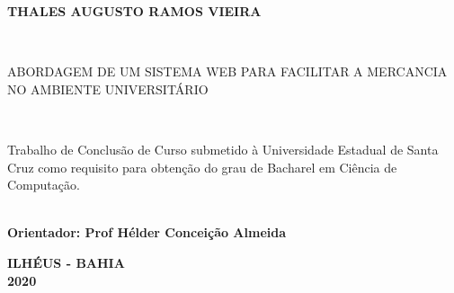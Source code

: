 
\begin{center}

    {\large \begin{large} \bfseries THALES AUGUSTO RAMOS VIEIRA \end{large}\\}
    \vspace{8cm}
    {\large\bfseries{\begin{large}ABORDAGEM DE UM SISTEMA WEB PARA FACILITAR A MERCANCIA NO AMBIENTE UNIVERSITÁRIO \end{large}}\\}
    \vspace{1cm}
    \hspace{.45\linewidth}
    \begin{minipage}{.50\linewidth}

    Trabalho de Conclusão de Curso submetido à Universidade Estadual de Santa Cruz como requisito para obtenção do grau de Bacharel em Ciência de Computação. 

            \textbf{\\ Orientador: Prof Hélder Conceição Almeida}
           
    
    \end{minipage}

    \vspace{2cm}
    \vfill
    {\large\bfseries{ ILHÉUS - BAHIA \\ 2020}}
\end{center}

